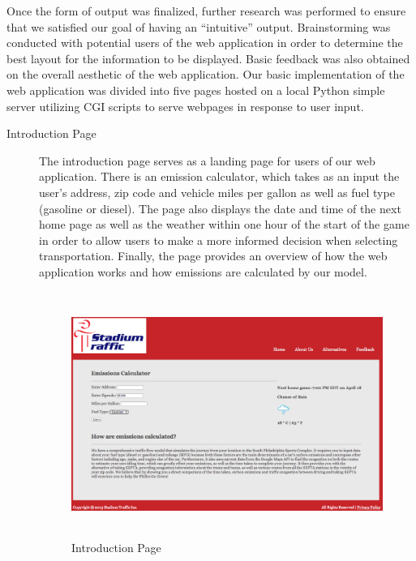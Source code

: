 Once the form of output was finalized, further research was performed
to ensure that we satisfied our goal of having an ``intuitive''
output. Brainstorming was conducted with potential users of the web
application in order to determine the best layout for the information
to be displayed. Basic feedback was also obtained on the overall
aesthetic of the web application. Our basic implementation of the web
application was divided into five pages hosted on a local Python
simple server utilizing CGI scripts to serve webpages in response to
user input.

\begin{description}
    \item[Introduction Page] The introduction page serves as a landing
  page for users of our web application. There is an emission
  calculator, which takes as an input the user's address, zip code and
  vehicle miles per gallon as well as fuel type (gasoline or
  diesel). The page also displays the date and time of the next home
  page as well as the weather within one hour of the start of the game
  in order to allow users to make a more informed decision when
  selecting transportation. Finally, the page provides an overview of
  how the web application works and how emissions are calculated by
  our model.
  \begin{figure}[htp]
    \centering
    \includegraphics[height=8cm]{graphics/website/intro.png}
    \caption{Introduction Page}
  \end{figure}


\end{description}
